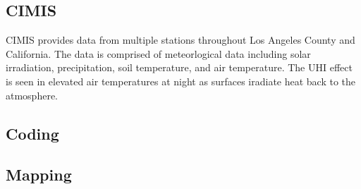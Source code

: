 \documentclass[letterpaper]{article}
\begin{document}
\subsection {CIMIS}
CIMIS provides data from multiple stations throughout Los Angeles County and California. The data is comprised of meteorlogical data including solar irradiation, precipitation, soil temperature, and air temperature. The UHI effect is seen in elevated air temperatures at night as surfaces iradiate heat back to the atmosphere. 

\subsection{Coding}
\subsection{Mapping}
\end{document}
